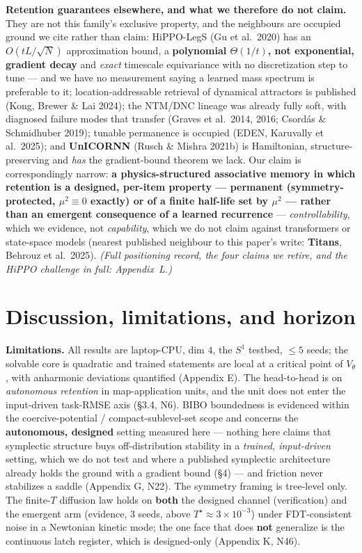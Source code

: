 \documentclass[10pt]{article}
\begin{document}
\textbf{Retention guarantees elsewhere, and what we therefore do not claim.} They are not this family's exclusive property, and the neighbours are occupied ground we cite rather than claim: HiPPO-LegS (Gu et al.\ 2020) has an $O(tL/\sqrt N)$ approximation bound, a \textbf{polynomial $\Theta(1/t)$, not exponential, gradient decay} and \emph{exact} timescale equivariance with no discretization step to tune --- and we have no measurement saying a learned mass spectrum is preferable to it; location-addressable retrieval of dynamical attractors is published (Kong, Brewer \& Lai 2024); the NTM/DNC lineage was already fully soft, with diagnosed failure modes that transfer (Graves et al.\ 2014, 2016; Csord\'as \& Schmidhuber 2019); tunable permanence is occupied (EDEN, Karuvally et al.\ 2025); and \textbf{UnICORNN} (Rusch \& Mishra 2021b) is Hamiltonian, structure-preserving and \emph{has} the gradient-bound theorem we lack. Our claim is correspondingly narrow: \textbf{a physics-structured associative memory in which retention is a designed, per-item property --- permanent (symmetry-protected, $\mu^2\equiv0$ exactly) or of a finite half-life set by $\mu^2$ --- rather than an emergent consequence of a learned recurrence} --- \emph{controllability}, which we evidence, not \emph{capability}, which we do not claim against transformers or state-space models (nearest published neighbour to this paper's write: \textbf{Titans}, Behrouz et al.\ 2025). \emph{(Full positioning record, the four claims we retire, and the HiPPO challenge in full: Appendix~L.)}


\section{Discussion, limitations, and horizon}

\textbf{Limitations.} All results are laptop-CPU, dim $4$, the $S^1$ testbed, $\le5$ seeds; the solvable core is quadratic and trained statements are local at a critical point of $V_\theta$, with anharmonic deviations quantified (Appendix E). The head-to-head is on \emph{autonomous retention} in map-application units, and the unit does not enter the input-driven task-RMSE axis (\S3.4, N6). BIBO boundedness is evidenced within the coercive-potential / compact-sublevel-set scope and concerns the \textbf{autonomous, designed} setting measured here --- nothing here claims that symplectic structure buys off-distribution stability in a \emph{trained, input-driven} setting, which we do not test and where a published symplectic architecture already holds the ground with a gradient bound (\S4) --- and friction never stabilizes a saddle (Appendix G, N22). The symmetry framing is tree-level only. The finite-$T$ diffusion law holds on \textbf{both} the designed channel (verification) and the emergent arm (evidence, $3$ seeds, above $T^\star\approx3\!\times\!10^{-3}$) under FDT-consistent noise in a Newtonian kinetic mode; the one face that does \textbf{not} generalize is the continuous latch register, which is designed-only (Appendix K, N46).
\end{document}
